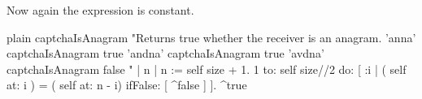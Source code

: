 \documentclass[10pt,twoside,english]{_support/latex/sbabook/sbabook}
\begin{document}
Now again the expression  is constant.
		

\begin{displaycode}{plain}
captchaIsAnagram
	"Returns true whether the receiver is an anagram.
	'anna' captchaIsAnagram
		true
	'andna' captchaIsAnagram 
		true
	'avdna' captchaIsAnagram 
		false
	"
	| n |
	n := self size + 1.
	1 
		to: self size//2 
		do: [ :i | 
			( self at:  i ) = ( self at:  n - i)
				ifFalse: [ ^false ]
				].
	^true
\end{displaycode}


\backmatter



\end{document}
